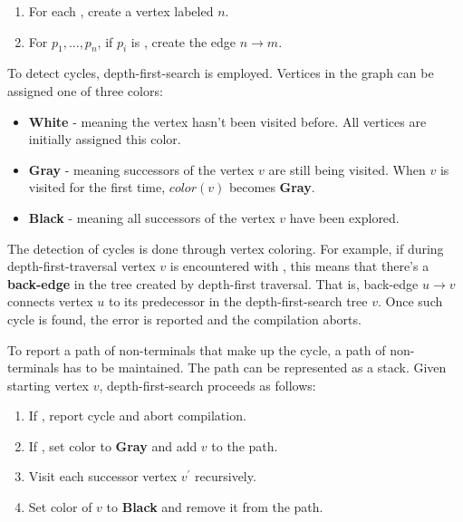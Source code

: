 \begin{enumerate}
\item
For each \NtDefinitionN[n], create a vertex labeled $n$.
\item
For $p_1, ..., p_n$, if $p_i$ is \NtDefinitionN[m], create the edge $n\rightarrow m$.
\end{enumerate}


To detect cycles, depth-first-search is employed. Vertices in the graph can be assigned one of three colors:

\begin{itemize}
\item

\textbf{White} - meaning the vertex hasn't been visited before. All vertices are initially assigned this color.

\item
\textbf{Gray} - meaning successors of the vertex $v$ are still being visited. When $v$ is visited for the first time, $color(v)$ becomes \textbf{Gray}.
\item
\textbf{Black} - meaning all successors of the vertex $v$ have been explored.
\end{itemize}



The detection of cycles is done through vertex coloring. For example, if during depth-first-traversal vertex $v$ is encountered with , this means that there's a \textbf{back-edge} in the tree created by depth-first traversal. That is, back-edge $u \rightarrow v$ connects vertex $u$ to its predecessor in the depth-first-search tree $v$. Once such cycle is found, the error is reported and the compilation aborts.

To report a path of non-terminals that make up the cycle, a path of non-terminals has to be maintained. The path can be represented as a stack. Given starting vertex $v$, depth-first-search proceeds as follows:

\begin{enumerate}
\item If , report cycle and abort compilation.
\item If , set color to \textbf{Gray} and add $v$ to the path.
\item Visit each successor vertex $v^{\prime}$ recursively.
\item Set color of $v$ to \textbf{Black} and remove it from the path.
\end{enumerate}


